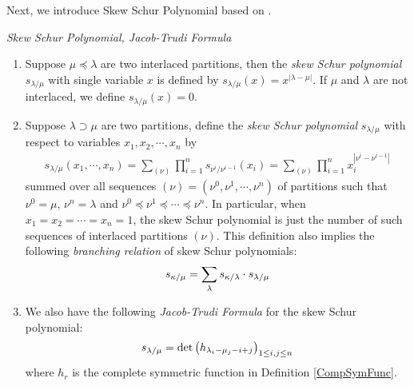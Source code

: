 Next, we introduce Skew Schur Polynomial based on \cite[Chapter 1, (5.4), (5.11), (5.12)]{Mac}.
\begin{definition} \emph{Skew Schur Polynomial, Jacob-Trudi Formula}{\label{DefSkewSchurPoly}}
\begin{enumerate}
	\item Suppose $\mu\preceq\lambda$ are two interlaced partitions, then the \emph{skew Schur polynomial} $s_{\lambda/\mu}$ with single variable $x$ is defined by $s_{\lambda/\mu}(x)=x^{|\lambda-\mu|}$. If $\mu$ and $\lambda$ are not interlaced, we define $s_{\lambda/\mu}(x)=0$.
	\item Suppose $\lambda\supset\mu$ are two partitions, define the \emph{skew Schur polynomial} $s_{\lambda/\mu}$ with respect to variables $x_1, x_2, \cdots, x_{n}$ by
	\begin{align}
		s_{\lambda/\mu}(x_1,\cdots,x_n)=\sum_{(\nu)}\prod_{i=1}^{n}s_{\nu^{i}/\nu^{i-1}}(x_i)=\sum_{(\nu)}\prod_{i=1}^{n}x_{i}^{|\nu^{i}-\nu^{i-1}|}
	\end{align}
	summed over all sequences $(\nu)=(\nu^{0},\nu^{1},\cdots,\nu^{n})$ of partitions such that $\nu^{0}=\mu$, $\nu^{n}=\lambda$ and $\nu^{0}\preceq\nu^{1}\preceq\cdots\preceq\nu^{n}$. In particular, when $x_1=x_2=\cdots=x_{n}=1$, the skew Schur polynomial is just the number of such sequences of interlaced partitions $(\nu)$.	 This definition also implies the following \emph{branching relation} of skew Schur polynomials:
	\begin{equation}{\label{Branch}}
		\begin{split}
			s_{\kappa/\mu}=\sum_{\lambda}s_{\kappa/\lambda}\cdot s_{\lambda/\mu}
		\end{split}
	\end{equation}
	\item We also have the following \emph{Jacob-Trudi Formula}\cite[Chapter 1, (5.4)]{Mac} for the skew Schur polynomial:
	\begin{align}{\label{J-TFormula}}
		s_{\lambda/\mu}=\det\left(h_{\lambda_{i}-\mu_{j}-i+j}\right)_{1\leq i,j\leq n}
	\end{align}
	where $h_r$ is the complete symmetric function in Definition \ref{CompSymFunc}.
\end{enumerate}
\end{definition}

